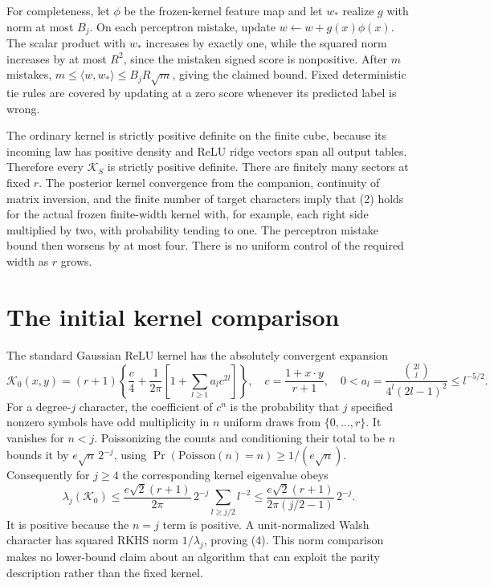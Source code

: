 \documentclass[11pt]{article}
\begin{document}
For completeness, let $\phi$ be the frozen-kernel feature map and let
$w_*$ realize $g$ with norm at most $B_j$. On each perceptron mistake,
update $w\leftarrow w+g(x)\phi(x)$. The scalar product with $w_*$
increases by exactly one, while the squared norm increases by at most
$R^2$, since the mistaken signed score is nonpositive. After $m$
mistakes, $m\le\langle w,w_*\rangle\le B_jR\sqrt m$, giving the
claimed bound. Fixed deterministic tie rules are covered by updating
at a zero score whenever its predicted label is wrong.

The ordinary kernel is strictly positive definite on the finite cube,
because its incoming law has positive density and ReLU ridge vectors
span all output tables. Therefore every $\mathcal K_S$ is strictly
positive definite. There are finitely many sectors at fixed $r$.
The posterior kernel convergence from the companion, continuity of
matrix inversion, and the finite number of target characters imply
that (2) holds for the actual frozen finite-width kernel with, for
example, each right side multiplied by two, with probability tending
to one. The perceptron mistake bound then worsens by at most four.
There is no uniform control of the required width as $r$ grows.

\section{The initial kernel comparison}
The standard Gaussian ReLU kernel has the absolutely convergent expansion
\[
 \mathcal K_0(x,y)=(r+1)\left\{\frac c4+
     \frac1{2\pi}\left[1+\sum_{l\ge1}a_lc^{2l}\right]\right\},
 \quad c=\frac{1+x\cdot y}{r+1},\quad
 0<a_l=\frac{\binom{2l}{l}}{4^l(2l-1)^2}\le l^{-5/2}.
\]
For a degree-$j$ character, the coefficient of $c^n$ is the probability
that $j$ specified nonzero symbols have odd multiplicity in $n$ uniform
draws from $\{0,\ldots,r\}$. It vanishes for $n<j$. Poissonizing
the counts and conditioning their total to be $n$ bounds it by
$e\sqrt n\,2^{-j}$, using
$\Pr(\mathrm{Poisson}(n)=n)\ge1/(e\sqrt n)$.
Consequently for $j\ge4$ the corresponding kernel eigenvalue obeys
\[
 \lambda_j(\mathcal K_0)
 \le\frac{e\sqrt2(r+1)}{2\pi}\,2^{-j}
                        \sum_{l\ge j/2}l^{-2}
 \le\frac{e\sqrt2(r+1)}{2\pi(j/2-1)}\,2^{-j}.
\]
It is positive because the $n=j$ term is positive. A unit-normalized
Walsh character has squared RKHS norm $1/\lambda_j$, proving (4).
This norm comparison makes no lower-bound claim about an algorithm
that can exploit the parity description rather than the fixed kernel.
\end{document}
